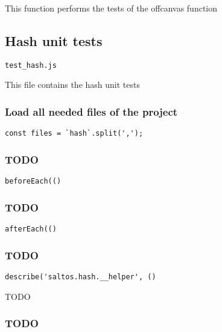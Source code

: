 \documentclass[a4paper]{article}
\begin{document}
This function performs the tests of the offcanvas function

\hypertarget{toc627}{}
\subsection{Hash unit tests}

\begin{lstlisting}
test_hash.js
\end{lstlisting}

This file contains the hash unit tests

\hypertarget{toc628}{}
\subsubsection{Load all needed files of the project}

\begin{lstlisting}
const files = `hash`.split(',');
\end{lstlisting}

\hypertarget{toc629}{}
\subsubsection{TODO}

\begin{lstlisting}
beforeEach(()
\end{lstlisting}

\hypertarget{toc630}{}
\subsubsection{TODO}

\begin{lstlisting}
afterEach(()
\end{lstlisting}

\hypertarget{toc631}{}
\subsubsection{TODO}

\begin{lstlisting}
describe('saltos.hash.__helper', ()
\end{lstlisting}

TODO

\hypertarget{toc632}{}
\subsubsection{TODO}
\end{document}
